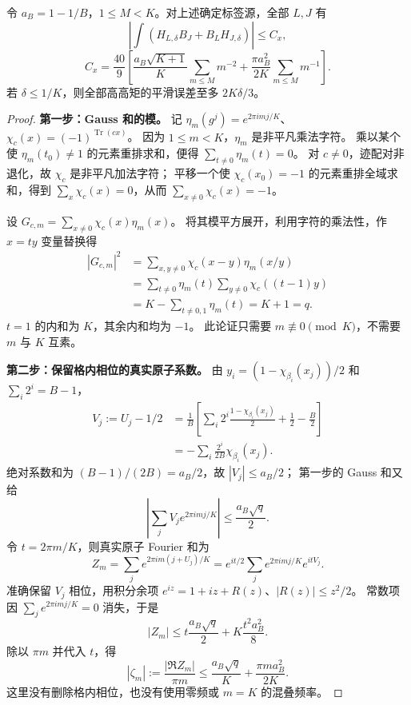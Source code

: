 \begin{lemma}[真实交叉与平滑预算]\label{lem:papercross}
令 $a_B=1-1/B$，$1\le M<K$。对上述确定标签源，全部 $L,J$ 有
\[
 \left|\int(H_{L,\delta}B_J+B_LH_{J,\delta})\right|\le C_x,
\]
\[
 C_x=\frac{40}{9}\left[
 \frac{a_B\sqrt{K+1}}K\sum_{m\le M}m^{-2}
 +\frac{\pi a_B^2}{2K}\sum_{m\le M}m^{-1}\right].
\]
若 $\delta\le1/K$，则全部高高矩的平滑误差至多 $2K\delta/3$。
\end{lemma}
\begin{proof}
\textbf{第一步：Gauss 和的模。}
记 $\eta_m(g^j)=e^{2\pi imj/K}$、$\chi_c(x)=(-1)^{\operatorname{Tr}(cx)}$。
因为 $1\le m<K$，$\eta_m$ 是非平凡乘法字符。
乘以某个使 $\eta_m(t_0)\ne1$ 的元素重排求和，便得
$\sum_{t\ne0}\eta_m(t)=0$。
对 $c\ne0$，迹配对非退化，故 $\chi_c$ 是非平凡加法字符；
平移一个使 $\chi_c(x_0)=-1$ 的元素重排全域求和，得到
$\sum_x\chi_c(x)=0$，从而 $\sum_{x\ne0}\chi_c(x)=-1$。

设 $G_{c,m}=\sum_{x\ne0}\chi_c(x)\eta_m(x)$。
将其模平方展开，利用字符的乘法性，作 $x=ty$ 变量替换得
\begin{align*}
 |G_{c,m}|^2
 &=\sum_{x,y\ne0}\chi_c(x-y)\eta_m(x/y)\\
 &=\sum_{t\ne0}\eta_m(t)\sum_{y\ne0}\chi_c((t-1)y)\\
 &=K-\sum_{t\ne0,1}\eta_m(t)=K+1=q.
\end{align*}
$t=1$ 的内和为 $K$，其余内和均为 $-1$。
此论证只需要 $m\not\equiv0\pmod K$，不需要 $m$ 与 $K$ 互素。

\textbf{第二步：保留格内相位的真实原子系数。}
由 $y_i=(1-\chi_{\beta_i}(x_j))/2$ 和 $\sum_i2^i=B-1$，
\begin{align*}
 V_j:=U_j-1/2
 &=\frac1B\left[\sum_i2^i\frac{1-\chi_{\beta_i}(x_j)}2
 +\frac12-\frac B2\right]\\
 &=-\sum_i\frac{2^i}{2B}\chi_{\beta_i}(x_j).
\end{align*}
绝对系数和为 $(B-1)/(2B)=a_B/2$，故 $|V_j|\le a_B/2$；
第一步的 Gauss 和又给
\[
 \left|\sum_jV_je^{2\pi imj/K}\right|
 \le\frac{a_B\sqrt q}{2}.
\]
令 $t=2\pi m/K$，则真实原子 Fourier 和为
\[
 Z_m=\sum_je^{2\pi im(j+U_j)/K}
 =e^{it/2}\sum_je^{2\pi imj/K}e^{itV_j}.
\]
准确保留 $V_j$ 相位，用积分余项
$e^{iz}=1+iz+R(z)$、$|R(z)|\le z^2/2$。
常数项因 $\sum_je^{2\pi imj/K}=0$ 消失，于是
\[
 |Z_m|\le t\frac{a_B\sqrt q}{2}+K\frac{t^2a_B^2}{8}.
\]
除以 $\pi m$ 并代入 $t$，得
\[
 |\zeta_m|:=\frac{|\Re Z_m|}{\pi m}
 \le\frac{a_B\sqrt q}{K}+\frac{\pi m a_B^2}{2K}.
\]
这里没有删除格内相位，也没有使用零频或 $m=K$ 的混叠频率。


\end{proof}

